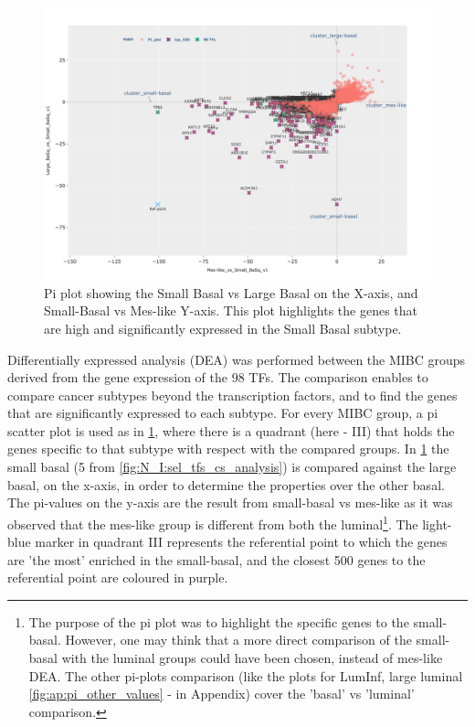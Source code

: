 \begin{figure}[!htb]   
\centering
\includegraphics[width=1.0\textwidth,height=1.0\textheight,keepaspectratio]{Sections/Network_I/Resources/selective_pruning/pi_gsea/pi_smallBasal.png}
  \caption{Pi plot showing the Small Basal vs Large Basal on the X-axis, and Small-Basal vs Mes-like Y-axis. This plot highlights the genes that are high and significantly expressed in the Small Basal subtype. }
\label{fig:N_I:pi_smallBasal_comp}
\end{figure}

Differentially expressed analysis (DEA) was performed between the MIBC groups derived from the gene expression of the 98 TFs. The comparison enables to compare cancer subtypes beyond the transcription factors, and to find the genes that are significantly expressed to each subtype. For every MIBC group, a pi scatter plot is used as in \cref{fig:N_I:pi_smallBasal_comp}, where there is a quadrant (here - III) that holds the genes specific to that subtype with respect with the compared groups. In \cref{fig:N_I:pi_smallBasal_comp} the small basal (5 from \cref{fig:N_I:sel_tfs_cs_analysis}) is compared against the large basal, on the x-axis, in order to determine the properties over the other basal. The pi-values on the y-axis are the result from small-basal vs mes-like as it was observed that the mes-like group is different from both the luminal\footnote{The purpose of the pi plot was to highlight the specific genes to the small-basal. However, one may think that a more direct comparison of the small-basal with the luminal groups could have been chosen, instead of mes-like DEA. The other pi-plots comparison (like the plots for LumInf,  large luminal \cref{fig:ap:pi_other_values} - in Appendix) cover the 'basal' vs 'luminal' comparison. }. The light-blue marker in quadrant III represents the referential point to which the genes are 'the most' enriched in the small-basal, and the closest 500 genes to the referential point are coloured in purple. 


